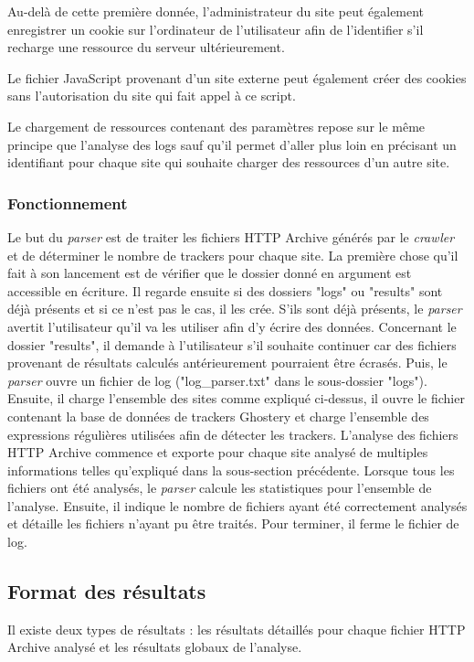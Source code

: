 Au-delà de cette première donnée, l'administrateur du site peut également enregistrer un cookie sur l'ordinateur de l'utilisateur afin de l'identifier s'il recharge une ressource du serveur ultérieurement.

Le fichier JavaScript provenant d'un site externe peut également créer des cookies sans l'autorisation du site qui fait appel à ce script.

Le chargement de ressources contenant des paramètres repose sur le même principe que l'analyse des logs sauf qu'il permet d'aller plus loin en précisant un identifiant pour chaque site qui souhaite charger des ressources d'un autre site.

\subsubsection{Fonctionnement}
Le but du \textit{parser} est de traiter les fichiers HTTP Archive générés par le \textit{crawler} et de déterminer le nombre de trackers pour chaque site. La première chose qu'il fait à son lancement est de vérifier que le dossier donné en argument est accessible en écriture. Il regarde ensuite si des dossiers "logs" ou "results" sont déjà présents et si ce n'est pas le cas, il les crée. S'ils sont déjà présents, le \textit{parser} avertit l'utilisateur qu'il va les utiliser afin d'y écrire des données. Concernant le dossier "results", il demande à l'utilisateur s'il souhaite continuer car des fichiers provenant de résultats calculés antérieurement pourraient être écrasés. Puis, le \textit{parser} ouvre un fichier de log ("log\_parser.txt" dans le sous-dossier "logs"). Ensuite, il charge l'ensemble des sites comme expliqué ci-dessus, il ouvre le fichier contenant la base de données de trackers Ghostery et charge l'ensemble des expressions régulières utilisées afin de détecter les trackers. L'analyse des fichiers HTTP Archive commence et exporte pour chaque site analysé de multiples informations telles qu'expliqué dans la sous-section précédente. Lorsque tous les fichiers ont été analysés, le \textit{parser} calcule les statistiques pour l'ensemble de l'analyse. Ensuite, il indique le nombre de fichiers ayant été correctement analysés et détaille les fichiers n'ayant pu être traités. Pour terminer, il ferme le fichier de log.

\subsection{Format des résultats}
Il existe deux types de résultats : les résultats détaillés pour chaque fichier HTTP Archive analysé et les résultats globaux de l'analyse.

